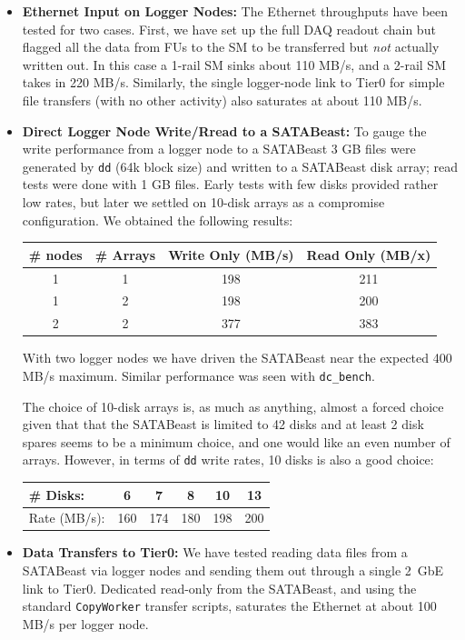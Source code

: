 \begin{itemize}
  \item {\bf Ethernet Input on Logger Nodes:} The Ethernet throughputs have been tested for two cases.
First, we have set up the full DAQ readout chain but flagged all the data from FUs to the SM
to be transferred but {\it not} actually written out. In this case a 1-rail SM sinks about 110 MB/s,
and a 2-rail SM takes in 220 MB/s.
Similarly, the single logger-node link to Tier0 for simple file transfers (with no other activity)
also saturates  at about  110 MB/s.
  \item {\bf Direct Logger Node Write/Rread to a SATABeast:} To gauge the write performance 
from a logger node to a SATABeast 3 GB files were generated by \verb+dd+ (64k block size)
and written to a  SATABeast disk array; read tests were done with 1 GB files. 
Early tests with few disks provided rather low rates, but
later we settled on 10-disk arrays as a compromise configuration. 
We obtained the following results:
\begin{center}
\begin{tabular}{c|c|c|c}
\# nodes   & \# Arrays & Write Only (MB/s) & Read Only (MB/x) \\ \hline
1          &     1     &     198           &    211\\
1          &     2     &     198           &    200\\
2          &     2     &     377           &    383\\ \hline
\end{tabular}
\label{tab:ddrates}
\end{center}
With two logger nodes we have driven the SATABeast near the expected 400 MB/s maximum.
Similar performance was seen with \verb+dc_bench+.

The choice of 10-disk arrays is, as much as anything, almost a forced choice
given that that the SATABeast is limited to 42 disks and at least 2 disk spares
seems to be a minimum choice, and one would like an even number of arrays.
However, in terms of \verb+dd+ write rates, 10 disks is also a good choice:
\begin{center}
\begin{tabular}{l|c|c|c|c|c} \hline
\# Disks:      &   6    &   7    & 8    & 10   &   13\\ \hline
Rate (MB/s):   & 160    & 174    & 180  & 198  &  200\\ \hline
\end{tabular}
\label{tab:ddrates2}
\end{center}
  \item {\bf Data Transfers to Tier0:} We have tested reading data files from
a  SATABeast via logger nodes and sending them out through a single  2~GbE link
to Tier0.
Dedicated read-only from the SATABeast, and using the standard \verb+CopyWorker+
transfer scripts, saturates the Ethernet at about 100 MB/s per logger node.
\end{itemize}

